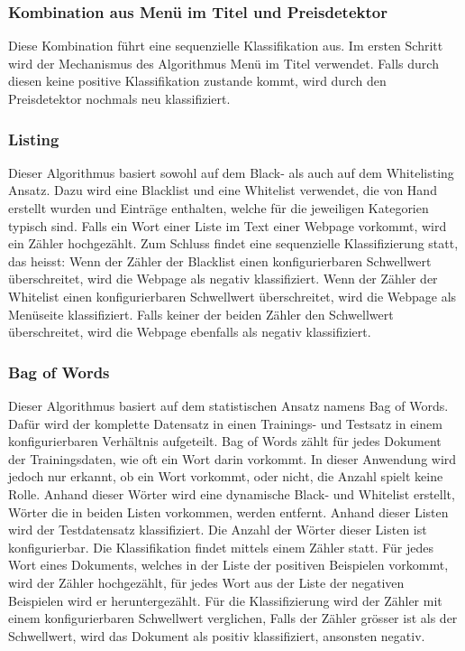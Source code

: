 \subsubsection{Kombination aus Menü im Titel und Preisdetektor}
Diese Kombination führt eine sequenzielle Klassifikation aus.
Im ersten Schritt wird der Mechanismus des Algorithmus \glqq Menü im Titel\grqq{} verwendet.
Falls durch diesen keine positive Klassifikation zustande kommt, wird durch den Preisdetektor nochmals neu klassifiziert.
\subsubsection{Listing}
Dieser Algorithmus basiert sowohl auf dem Black- als auch auf dem Whitelisting Ansatz.
Dazu wird eine Blacklist und eine Whitelist verwendet, die von Hand erstellt wurden und Einträge enthalten, welche für die jeweiligen Kategorien typisch sind.
Falls ein Wort einer Liste im Text einer Webpage vorkommt, wird ein Zähler hochgezählt.
Zum Schluss findet eine sequenzielle Klassifizierung statt, das heisst: 
Wenn der Zähler der Blacklist einen konfigurierbaren Schwellwert überschreitet, wird die Webpage als negativ klassifiziert. 
Wenn der Zähler der Whitelist einen konfigurierbaren Schwellwert überschreitet, wird die Webpage als Menüseite klassifiziert.
Falls keiner der beiden Zähler den Schwellwert überschreitet, wird die Webpage ebenfalls als negativ klassifiziert. 
\subsubsection{Bag of Words}
Dieser Algorithmus basiert auf dem statistischen Ansatz namens \glqq Bag of Words\grqq{}.
Dafür wird der komplette Datensatz in einen Trainings- und Testsatz in einem konfigurierbaren Verhältnis aufgeteilt.
Bag of Words zählt für jedes Dokument der Trainingsdaten, wie oft ein Wort darin vorkommt.
In dieser Anwendung wird jedoch nur erkannt, ob ein Wort vorkommt, oder nicht, die Anzahl spielt keine Rolle.
Anhand dieser Wörter wird eine dynamische Black- und Whitelist erstellt, Wörter die in beiden Listen vorkommen, werden entfernt.
Anhand dieser Listen wird der Testdatensatz klassifiziert.
Die Anzahl der Wörter dieser Listen ist konfigurierbar.
Die Klassifikation findet mittels einem Zähler statt.
Für jedes Wort eines Dokuments, welches in der Liste der positiven Beispielen vorkommt, wird der Zähler hochgezählt, für jedes Wort aus der Liste der negativen Beispielen wird er heruntergezählt.
Für die Klassifizierung wird der Zähler mit einem konfigurierbaren Schwellwert verglichen, Falls der Zähler grösser ist als der Schwellwert, wird das Dokument als positiv klassifiziert, ansonsten negativ.
